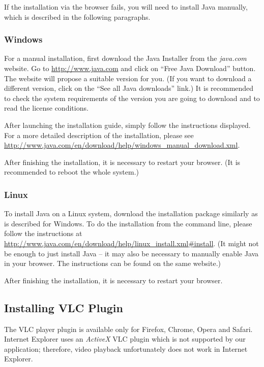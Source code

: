 If the installation via the browser fails, you will need to install Java manually, which is described in the following paragraphs.

\subsubsection{Windows}

For a manual installation, first download the Java Installer from the \emph{java.com} website. Go to \url{http://www.java.com} and click on ``Free Java Download'' button. The website will propose a suitable version for you. (If you want to download a different version, click on the ``See all Java downloads'' link.) It is recommended to check the system requirements of the version you are going to download and to read the license conditions.

After launching the installation guide, simply follow the instructions displayed. For a more detailed description of the installation, please see \url{http://www.java.com/en/download/help/windows_manual_download.xml}.

After finishing the installation, it is necessary to restart your browser.
(It is recommended to reboot the whole system.)

\subsubsection{Linux}

To install Java on a Linux system, download the installation package similarly as is described for Windows. To do the installation from the command line, please follow the instructions at \url{http://www.java.com/en/download/help/linux_install.xml#install}. (It might not be enough to just install Java -- it may also be necessary to manually enable Java in your browser. The instructions can be found on the same website.)

After finishing the installation, it is necessary to restart your browser.

\subsection{Installing VLC Plugin}

The VLC player plugin is available only for Firefox, Chrome, Opera and Safari. Internet Explorer uses an \emph{ActiveX} VLC plugin which is not supported by our application; therefore, video playback unfortunately does not work in Internet Explorer.

